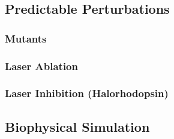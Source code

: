 \documentclass[letter,11pt]{article}
\begin{document}
\subsection{Predictable Perturbations}

\subsubsection{Mutants}

\subsubsection{Laser Ablation}

\subsubsection{Laser Inhibition (Halorhodopsin)}

\subsection{Biophysical Simulation}
\end{document}
